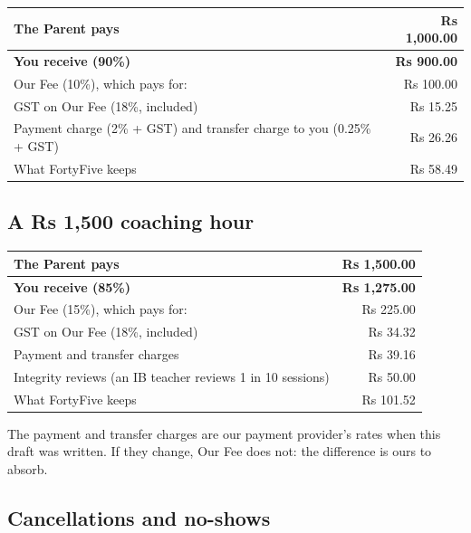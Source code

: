 \documentclass[11pt]{article}
\begin{document}
\noindent\begin{tabularx}{\linewidth}{@{}X r@{}}
\toprule
The Parent pays & Rs 1,000.00 \\
\midrule
\textbf{You receive (90\%)} & \textbf{Rs 900.00} \\
Our Fee (10\%), which pays for: & Rs 100.00 \\
\quad GST on Our Fee (18\%, included) & Rs 15.25 \\
\quad Payment charge (2\% + GST) and transfer charge to you (0.25\% + GST) & Rs 26.26 \\
\quad What FortyFive keeps & Rs 58.49 \\
\bottomrule
\end{tabularx}

\subsection*{A Rs 1,500 coaching hour}

\noindent\begin{tabularx}{\linewidth}{@{}X r@{}}
\toprule
The Parent pays & Rs 1,500.00 \\
\midrule
\textbf{You receive (85\%)} & \textbf{Rs 1,275.00} \\
Our Fee (15\%), which pays for: & Rs 225.00 \\
\quad GST on Our Fee (18\%, included) & Rs 34.32 \\
\quad Payment and transfer charges & Rs 39.16 \\
\quad Integrity reviews (an IB teacher reviews 1 in 10 sessions) & Rs 50.00 \\
\quad What FortyFive keeps & Rs 101.52 \\
\bottomrule
\end{tabularx}

The payment and transfer charges are our payment provider's rates when this draft was written. If they change, Our Fee does not: the difference is ours to absorb.

\subsection*{Cancellations and no-shows}
\end{document}
